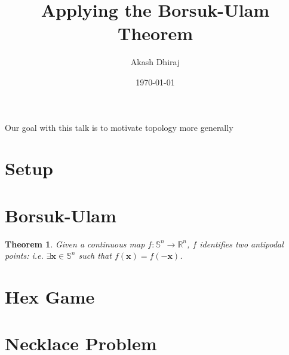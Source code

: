 \documentclass[12pt]{amsart}
\newtheorem{theorem}{Theorem}
\begin{document}
    \title{Applying the Borsuk-Ulam Theorem}
    \author{Akash Dhiraj}
    \date{\today}

    \maketitle

    \newpage

    Our goal with this talk is to motivate topology more generally

    \section{Setup}

    \newpage

    \section{Borsuk-Ulam}

    \begin{theorem}
        Given a continuous map $f: \mathbb S^n \to \mathbb R^n$, $f$ identifies two antipodal points: i.e. $\exists \mathbf x \in \mathbb S^n$ such that $f(\mathbf x) = f(-\mathbf x)$.
    \end{theorem}

    \newpage

    \section{Hex Game}

    \newpage

    \section{Necklace Problem}

    \newpage


    
\end{document}
